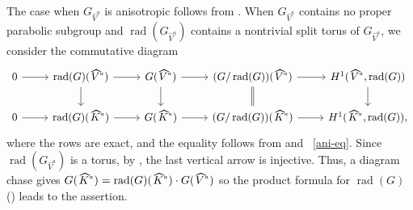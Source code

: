 \documentclass[a4paper,11pt,reqno]{amsart}
\newcommand{\wh}{\widehat}
\newcommand{\hva}{\!\stackon[-8pt]{\;$V^{\raisebox{1pt}{$\mathsmaller{\mathsmaller{a}}$}}$}{\vstretch{1.5}{\hstretch{1.7}{\widehat{\phantom{}}}}}}
\newcommand{\hka}{\!\stackon[-8pt]{\;$K^{\raisebox{1pt}{$\mathsmaller{\mathsmaller{a}}$}}$}{\vstretch{1.5}{\hstretch{1.7}{\widehat{\phantom{}}}}}}
\newcommand{\nhva}{\wh{V}^a}
\DeclareMathOperator{\rad}{rad}			                       %
\theoremstyle{plain}
\theoremstyle{remark}
\theoremstyle{definition}
\theoremstyle{plain}
\theoremstyle{definition}
\theoremstyle{subsection-tweak}
\theoremstyle{subsection-tweak}
\numberwithin{equation}{subsection}
\begin{document}
      The case when $G_{\nhva}$ is anisotropic follows from . 
      When $G_{\nhva}$ contains no proper parabolic subgroup and $\rad(G_{\nhva})$ contains a nontrivial split torus of $G_{\nhva}$, we consider the commutative diagram
      \begin{equation}
      \begin{tikzcd}
      0  \arrow{r}
      & \rad(G)(\hva) \arrow{d} \arrow{r} & G(\hva) \arrow{d} \arrow{r} & (G/\rad(G))(\hva) \ar[equal]{d}        \arrow{r} & H^1(\hva, \rad(G)) \arrow{d} \\
      0 \arrow{r} & \rad(G)(\hka) \arrow{r} & G(\hka) \arrow{r} & (G/\rad(G))(\hka) \arrow{r} & H^1(\hka,\rad(G)),
      \end{tikzcd}
      \end{equation}
      where the rows are exact, and the equality follows from  and ~\ref{ani-eq}. 
      Since $\rad(G_{\nhva})$ is a torus, by , the last vertical arrow is injective. 
      Thus, a diagram chase gives $G(\hka)=\rad(G)(\hka)\cdot G(\hva)$ so the product formula for $\rad(G)$ () leads to the assertion.
\end{document}
